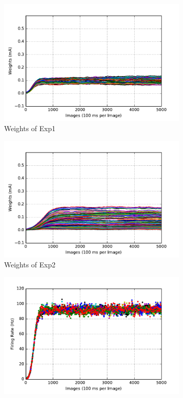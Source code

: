 \begin{figure}
	\centering
	\begin{subfigure}[t]{0.4\textwidth}
		\includegraphics[width=\textwidth]{pics_sdlm/03_exp_SAE_noise_long/exp1_weights_s.pdf}
		\caption{Weights of Exp1}
	\end{subfigure}
	\begin{subfigure}[t]{0.4\textwidth}
		\includegraphics[width=\textwidth]{pics_sdlm/03_exp_SAE_noise_long/exp2_weights_s.pdf}
		\caption{Weights of Exp2}
	\end{subfigure}
	\begin{subfigure}[t]{0.4\textwidth}
		\includegraphics[width=\textwidth]{pics_sdlm/03_exp_SAE_noise_long/exp1_recon_s.pdf}

\end{subfigure}
\end{figure}
